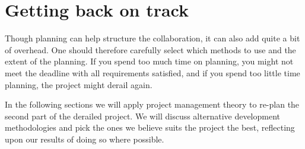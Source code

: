 \section{Getting back on track}
Though planning can help structure the collaboration, it can also add quite a bit of overhead. One should therefore carefully select which methods to use and the extent of the planning. If you spend too much time on planning, you might not meet the deadline with all requirements satisfied, and if you spend too little time planning, the project might derail again.

In the following sections we will apply project management theory to re-plan the second part of the derailed project. We will discuss alternative development methodologies and pick the ones we believe suits the project the best, reflecting upon our results of doing so where possible.






\newpage